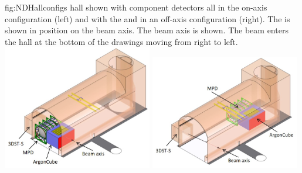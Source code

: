 \begin{dunefigure}{fig:NDHallconfigs}
{  hall shown with component detectors all in the on-axis configuration (left) and with the  and  in an off-axis configuration (right). The  is shown in position on the beam axis. The beam axis is shown.  The beam enters the hall at the bottom of the drawings moving from right to left.}
\includegraphics[width=0.49\textwidth]{graphics/NDHall_onaxis.jpg}
\includegraphics[width=0.49\textwidth]{graphics/NDHall_offaxis.jpg}
\end{dunefigure}


